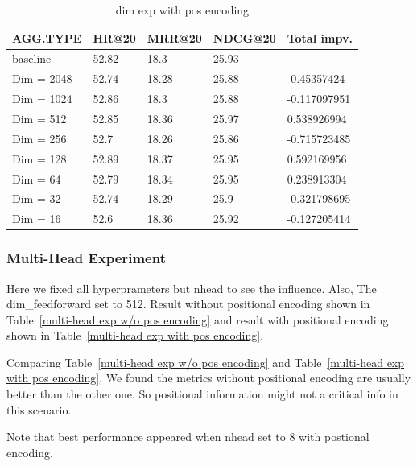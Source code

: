 \documentclass{article}
\begin{document}
\begin{table}
    \caption{dim exp with pos encoding}
    \label{dim exp with pos encoding}
    \centering
    \begin{tabular}{lllll}
        \toprule
        AGG.TYPE   & HR@20 & MRR@20 & NDCG@20 & Total impv.  \\
        \midrule
        baseline   & 52.82 & 18.3   & 25.93   & -            \\
        Dim = 2048 & 52.74 & 18.28  & 25.88   & -0.45357424  \\
        Dim = 1024 & 52.86 & 18.3   & 25.88   & -0.117097951 \\
        Dim = 512  & 52.85 & 18.36  & 25.97   & 0.538926994  \\
        Dim = 256  & 52.7  & 18.26  & 25.86   & -0.715723485 \\
        Dim = 128  & 52.89 & 18.37  & 25.95   & 0.592169956  \\
        Dim = 64   & 52.79 & 18.34  & 25.95   & 0.238913304  \\
        Dim = 32   & 52.74 & 18.29  & 25.9    & -0.321798695 \\
        Dim = 16   & 52.6  & 18.36  & 25.92   & -0.127205414 \\
        \bottomrule
    \end{tabular}
\end{table}

\subsubsection{Multi-Head Experiment}

Here we fixed all hyperprameters but nhead to see the influence.
Also, The dim\_feedforward set to 512.
Result without positional encoding shown in
Table~\ref{multi-head exp w/o pos encoding} and result with
positional encoding shown in Table~\ref{multi-head exp with pos encoding}.

Comparing  Table~\ref{multi-head exp w/o pos encoding} and
Table~\ref{multi-head exp with pos encoding},
We found the metrics without positional encoding are usually
better than the other one.
So positional information might not a critical info in this scenario.

Note that best performance appeared when nhead set to 8 with postional encoding.
\end{document}
